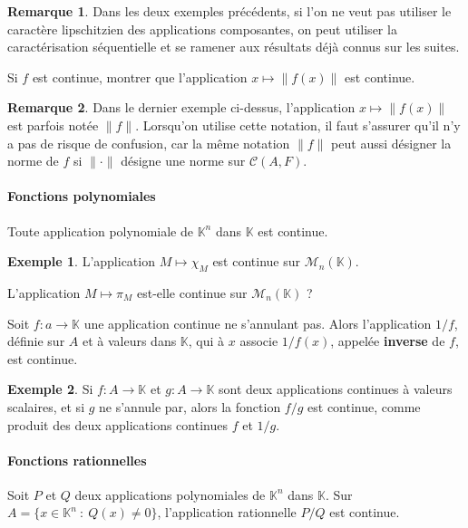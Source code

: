 \documentclass[french]{article}
\newcommand{\K}{\mathbb{K}}
\theoremstyle{plain}
\theoremstyle{definition}
\newtheorem*{ex}{Exemple}
\newtheorem*{rmq}{Remarque}
\theoremstyle{remark}
\begin{document}
\begin{rmq}
	Dans les deux exemples précédents, si l'on ne veut pas utiliser le caractère lipschitzien des applications composantes, on peut utiliser la caractérisation séquentielle et se ramener aux résultats déjà connus sur les suites.
\end{rmq}

\begin{exo}
	Si $f$ est continue, montrer que l'application $x\mapsto \lVert f(x)\rVert$ est continue.
\end{exo}

\begin{rmq}
	Dans le dernier exemple ci-dessus, l'application $x\mapsto\lVert f(x)\rVert$ est parfois notée $\lVert f\rVert$. Lorsqu'on utilise cette notation, il faut s'assurer qu'il n'y a pas de risque de confusion, car la même notation $\lVert f\rVert$ peut aussi désigner la norme de $f$ si $\lVert\cdot\rVert$ désigne une norme sur $\mathcal{C}(A,F)$.
\end{rmq}

\paragraph{Fonctions polynomiales} Toute application polynomiale de $\K^n$ dans $\K$ est continue.

\begin{ex}
	L'application $M\mapsto \chi_M$ est continue sur $\mathcal{M}_n(\K)$. %
\end{ex}

\begin{exo}
	L'application $M\mapsto\pi_M$ est-elle continue sur $\mathcal{M}_n(\K)$ ?
\end{exo}

\begin{prop}%
	Soit $f:a\to\K$ une application continue ne s'annulant pas. Alors l'application $1/f$, définie sur $A$ et à valeurs dans $\K$, qui à $x$ associe $1/f(x)$, appelée \textbf{inverse} de $f$, est continue.
\end{prop}

\begin{ex}
	Si $f:A\to\K$ et $g:A\to\K$ sont deux applications continues à valeurs scalaires, et si $g$ ne s'annule par, alors la fonction $f/g$ est continue, comme produit des deux applications continues $f$ et $1/g$.
\end{ex}

\paragraph{Fonctions rationnelles} Soit $P$ et $Q$ deux applications polynomiales de $\K^n$ dans $\K$. Sur $A=\{x\in\K^n\ :\ Q(x)\ne 0\}$, l'application rationnelle $P/Q$ est continue.
\end{document}
